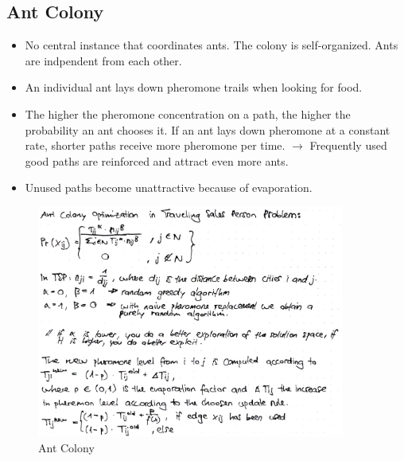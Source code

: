 \subsection{Ant Colony}
\begin{itemize}
    \item No central instance that coordinates ants. The colony is self-organized. Ants are indpendent from each other. 
    \item An individual ant lays down pheromone trails when looking for food. 
    \item The higher the pheromone concentration on a path, the higher the probability an ant chooses it. If an ant lays down pheromone at a constant rate, shorter paths receive more pheromone per time. $\rightarrow$ Frequently used good paths are reinforced and attract even more ants.
    \item Unused paths become unattractive because of evaporation.
\end{itemize}

\begin{figure}[H]
\centering
\includegraphics[width=0.9\textwidth]{figures/ants.png}
\caption{Ant Colony}
\end{figure}

\clearpage
